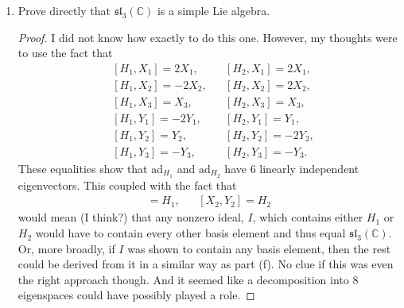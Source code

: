\documentclass[12pt]{article}
\theoremstyle{definition}
\begin{document}
\begin{enumerate}
\begin{enumerate}[label=(\alph*)]
\begin{proof}
\begin{equation*}
\begin{split}
                                &=\alpha\phi(H_1)+\beta\phi(X_1)+\gamma\phi(Y_1)
                                \\
                                &=\alpha h+\beta x+\gamma y \\
                                &= 0,
                            \end{split}
                        \end{equation*}
                        which implies that $\alpha=\beta=\gamma=0$. Thus,
                        $\ker\phi=\{0\}$. Therefore, $\phi$ is injective.
                    \end{proof}
                \item Prove directly that $\mathfrak{sl}_3(\mathbb{C})$ is
                    a simple Lie algebra.
                    \begin{proof}
                        I did not know how exactly to do this one. However, my thoughts were to use the fact that 
                            \begin{align*}
                                &[H_1, X_1]=2X_1,& &[H_2, X_1]=2X_1,\\ &[H_1, X_2]=-2X_2,& &[H_2, X_2]=2X_2, \\
                                &[H_1, X_3]=X_3,& &[H_2, X_3]=X_3, \\ &[H_1, Y_1]=-2Y_1,& &[H_2, Y_1]=Y_1, \\
                                &[H_1, Y_2]=Y_2,& &[H_2, Y_2]=-2Y_2, \\ &[H_1, Y_3]=-Y_3,& &[H_2, Y_3]=-Y_3.
                            \end{align*}
                        These equalities show that $\text{ad}_{H_1}$ and $\text{ad}_{H_2}$ have 6 linearly independent eigenvectors. This coupled with the fact that 
                            \begin{align*}
                                [X_1, Y_1]=H_1,& &[X_2, Y_2]=H_2
                            \end{align*}
                        would mean (I think?) that any nonzero ideal, $I$, which contains either $H_1$ or $H_2$ would have to contain every other basis element and thus equal $\mathfrak{sl}_3(\mathbb{C})$. Or, more broadly, if $I$ was shown to contain any basis element, then the rest could be derived from it in a similar way as part (f). No clue if this was even the right approach though. And it seemed like a decomposition into 8 eigenspaces could have possibly played a role.
                    \end{proof}

\end{enumerate}
\end{enumerate}
\end{document}
